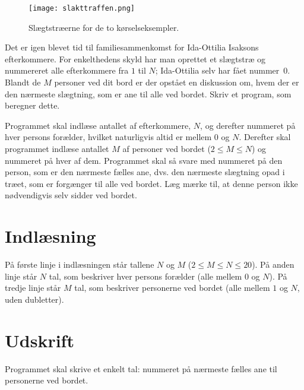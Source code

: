 \begin{figure}[h!]
  \centering
  \texttt{[image: slakttraffen.png]}
  \caption{Slægtstræerne for de to kørselseksempler.}
\end{figure}

Det er igen blevet tid til familiesammenkomst for  Ida-Ottilia Isaksons efterkommere.
For enkelthedens skyld har man oprettet et slægtstræ og nummereret alle efterkommere fra $1$ til $N$; Ida-Ottilia selv har fået nummer~$0$.
Blandt de $M$ personer ved dit bord er der opstået en diskussion om, hvem der er den nærmeste slægtning, som er ane til alle ved bordet.
Skriv et program, som beregner dette.

Programmet skal indlæse antallet af efterkommere, $N$, og derefter nummeret på hver persons forælder, hvilket naturligvis altid er mellem $0$ og $N$.
Derefter skal programmet indlæse antallet $M$ af personer ved bordet ($2 \le M \le N$) og nummeret på hver af dem.
Programmet skal så svare med nummeret på den person, som er den nærmeste fælles ane, dvs. den nærmeste slægtning opad i træet, som er forgænger til alle ved bordet.
Læg mærke til, at denne person ikke nødvendigvis selv sidder ved bordet.

\section*{Indlæsning}
På første linje i indlæsningen står tallene $N$ og $M$ ($2 \le M \le N \le 20$).
På anden linje står $N$ tal, som beskriver hver persons forælder (alle mellem $0$ og $N$).
På tredje linje står $M$ tal, som beskriver personerne ved bordet (alle mellem $1$ og $N$, uden dubletter).

\section*{Udskrift}
Programmet skal skrive et enkelt tal: nummeret på nærmeste fælles ane til personerne ved bordet.
